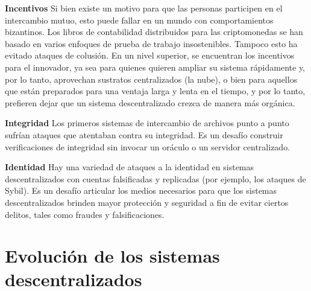 \documentclass[12pt]{report} %
\begin{document}
\textbf{Incentivos} Si bien existe un motivo para que las personas participen en el intercambio mutuo, esto puede fallar en un mundo con comportamientos bizantinos. Los libros de contabilidad distribuidos para las criptomonedas se han basado en varios enfoques de prueba de trabajo insostenibles. Tampoco esto ha evitado ataques de colusión. En un nivel superior, se encuentran los incentivos para el innovador, ya sea para quienes quieren ampliar su sistema rápidamente y, por lo tanto, aprovechan sustratos centralizados (la nube), o bien para aquellos que están preparados para una ventaja larga y lenta en el tiempo, y por lo tanto, prefieren dejar que un sistema descentralizado crezca de manera más orgánica.  

\textbf{Integridad} Los primeros sistemas de intercambio de archivos punto a punto sufrían ataques que atentaban contra su integridad. Es un desafío construir verificaciones de integridad sin invocar un oráculo o un servidor centralizado. 

\textbf{Identidad} Hay una variedad de ataques a la identidad en sistemas descentralizados con cuentas falsificadas y replicadas (por ejemplo, los ataques de Sybil).  Es un desafío articular los medios necesarios para que los sistemas descentralizados brinden mayor protección y seguridad  a fin de evitar  ciertos delitos, tales como fraudes y falsificaciones.


\section{Evolución de los sistemas descentralizados}
\label{Evoluciondescentralizacion}
\end{document}
